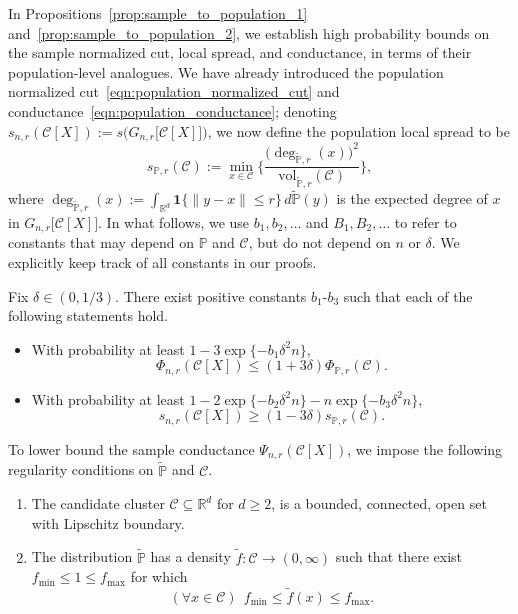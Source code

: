 \documentclass[11pt,twoside]{article}
\newcommand{\Reals}{\mathbb{R}}
\newcommand{\1}{\mathbf{1}}
\newcommand{\Rd}{\Reals^d}
\newcommand{\mc}[1]{\mathcal{#1}}
\newcommand{\Pbb}{\mathbb{P}}
\newcommand{\wt}[1]{\widetilde{#1}}
\newcommand{\vol}{\mathrm{vol}}
\begin{document}
In Propositions~\ref{prop:sample_to_population_1} and~\ref{prop:sample_to_population_2}, we establish high probability bounds on the sample normalized cut, local spread, and conductance, in terms of their population-level analogues. We have already introduced the population normalized cut~\eqref{eqn:population_normalized_cut} and conductance~\eqref{eqn:population_conductance}; denoting $s_{n,r}(\mc{C}[X]) := s\bigl(G_{n,r}\bigl[\mc{C}[X]\bigr]\bigr)$, we now define the population local spread to be
\begin{equation}
\label{eqn:local_spread}
s_{\Pbb,r}(\mc{C}) := \min_{x \in \mc{C}} \biggl\{\frac{\bigl(\deg_{\wt{\Pbb},r}(x)\bigr)^2}{\vol_{\wt{\Pbb},r}(\mc{C})} \biggr\},
\end{equation}
where $\deg_{\wt{\Pbb},r}(x) := \int_{\Rd} \1\{\|y - x\| \leq r\} \,d\wt{\Pbb}(y)$ is the expected degree of $x$ in $G_{n,r}\bigl[\mc{C}[X]\bigr]$. In what follows, we use $b_1,b_2,\ldots$ and $B_1,B_2,\ldots$ to refer to constants that may depend on $\Pbb$ and $\mc{C}$, but do not depend on $n$ or $\delta$. We explicitly keep track of all constants in our proofs.
\begin{proposition}
	\label{prop:sample_to_population_1}
	Fix $\delta \in (0,1/3)$. There exist positive constants $b_1$-$b_3$ such that each of the following statements hold.
	\begin{itemize}
		\item With probability at least $1 - 3\exp\{-b_1\delta^2n\}$,
		\begin{equation}
		\label{eqn:sample_to_population_normalized_cut}
		\Phi_{n,r}(\mc{C}[X]) \leq (1 + 3\delta) \Phi_{\Pbb,r}(\mc{C}).
		\end{equation}
		\item With probability at least $1 - 2\exp\{-b_2\delta^2n\} - n\exp\{-b_3\delta^2n\}$,
		\begin{equation}
		\label{eqn:sample_to_population_local_spread}
		s_{n,r}(\mc{C}[X]) \geq (1 - 3\delta) s_{\Pbb,r}(\mc{C}).
		\end{equation}
	\end{itemize}
\end{proposition}
To lower bound the sample conductance $\Psi_{n,r}(\mc{C}[X])$, we impose the following regularity conditions on $\wt{\Pbb}$ and $\mc{C}$.
\begin{enumerate}[label=(A\arabic*)]
	\item 
	\label{asmp:domain} 
	The candidate cluster $\mc{C} \subseteq \Rd$ for $d \geq 2$, is a bounded, connected, open set with Lipschitz boundary. 
	\item 
	\label{asmp:bounded_density} 
	The distribution $\wt{\Pbb}$ has a density $\wt{f}: \mc{C} \to (0,\infty)$ such that there exist $f_{\min} \leq 1 \leq f_{\max}$ for which
	\begin{equation*}
	(\forall x \in \mc{C})~~ f_{\min} \leq \wt{f}(x) \leq f_{\max}.
	\end{equation*}
\end{enumerate}
\end{document}
